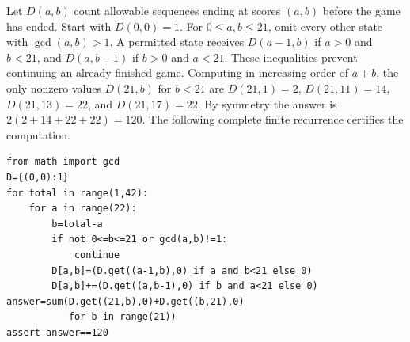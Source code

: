 Let $D(a,b)$ count allowable sequences ending at scores $(a,b)$ before the game has ended. Start with $D(0,0)=1$. For $0\le a,b\le21$, omit every other state with $\gcd(a,b)>1$. A permitted state receives $D(a-1,b)$ if $a>0$ and $b<21$, and $D(a,b-1)$ if $b>0$ and $a<21$. These inequalities prevent continuing an already finished game. Computing in increasing order of $a+b$, the only nonzero values $D(21,b)$ for $b<21$ are $D(21,1)=2$, $D(21,11)=14$, $D(21,13)=22$, and $D(21,17)=22$. By symmetry the answer is $2(2+14+22+22)=\boxed{120}$. The following complete finite recurrence certifies the computation.\begin{verbatim}
from math import gcd
D={(0,0):1}
for total in range(1,42):
    for a in range(22):
        b=total-a
        if not 0<=b<=21 or gcd(a,b)!=1:
            continue
        D[a,b]=(D.get((a-1,b),0) if a and b<21 else 0)
        D[a,b]+=(D.get((a,b-1),0) if b and a<21 else 0)
answer=sum(D.get((21,b),0)+D.get((b,21),0)
           for b in range(21))
assert answer==120
\end{verbatim}

